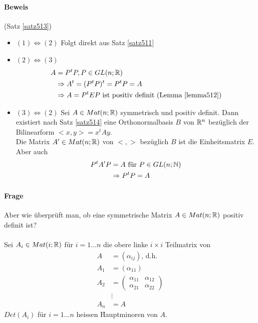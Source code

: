 \paragraph{Beweis} (Satz \ref{satz513}) \\
\begin{itemize}
\item $(1) \Leftrightarrow (2)$ Folgt direkt aus Satz \ref{satz511}

\item $(2) \Leftrightarrow (3)$
\begin{align}
A &= P^t P, P \in GL(n; \mathbb{R}) \\
&\Rightarrow A^t = (P^t P)^t = P^t P = A \\
&\Rightarrow A = P^t EP \text{ ist positiv definit (Lemma \ref{lemma512})}
\end{align}

\item $(3) \Leftrightarrow (2)$ Sei $A \in Mat(n; \mathbb{R})$ symmetrisch und positiv definit. Dann existiert nach Satz \ref{satz514} eine Orthonormalbasis $B$ von $\mathbb{R}^n$ bezüglich der Bilinearform $<x, y> = x^t Ay$. \\
Die Matrix $A' \in Mat(n; \mathbb{R})$ von $<, >$ bezüglich $B$ ist die Einheitsmatrix $E$. \\
Aber auch
\begin{align}
P^t A' P &= A \text{ für } P \in GL(n; \mathbb{N}) \\
&\Rightarrow P^t P = A
\end{align}
\end{itemize}

\paragraph{Frage} Aber wie überprüft man, ob eine symmetrische Matrix $A \in Mat(n; \mathbb{R})$ positiv definit ist? \\\\

Sei $A_i \in Mat(i; \mathbb{R})$ für $i=1...n$ die obere linke $i \times i$ Teilmatrix von
\begin{align}
A &= (\alpha_{ij}) \text{, d.h. } \\ 
A_1 &= (\alpha_{11}) \\
A_2 &= \begin{pmatrix} \alpha_{11} & \alpha_{12} \\ \alpha_{21} & \alpha_{22} \end{pmatrix} \\
&\vdots \\
A_n &= A
\end{align}
$Det(A_i)$ für $i=1...n$ heissen \f{Hauptminoren} von $A$.

